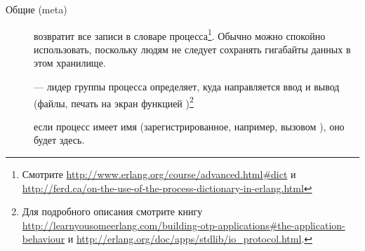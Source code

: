 \documentclass[11pt, oneside]{book}   	%
\begin{document}
\begin{description*}
	\item[Общие (meta)] \hfill
		\begin{description}		
	\item[] возвратит все записи в словаре процесса\footnote{Смотрите \href{http://www.erlang.org/course/advanced.html\#dict}{http://www.erlang.org/course/advanced.html\#dict} и \href{http://ferd.ca/on-the-use-of-the-process-dictionary-in-erlang.html}{http://ferd.ca/on-the-use-of-the-process-dictionary-in-erlang.html}}. Обычно можно спокойно использовать, поскольку людям не следует сохранять гигабайты данных в этом хранилище.
		
	\item[] --- лидер группы процесса определяет, куда направляется ввод и вывод (файлы, печать на экран функцией )\footnote{Для подробного описания смотрите книгу \href{http://learnyousomeerlang.com/building-otp-applications\#the-application-behaviour}{http://learnyousomeerlang.com/building-otp-applications\#the-application-behaviour} и \href{http://erlang.org/doc/apps/stdlib/io\_protocol.html}{http://erlang.org/doc/apps/stdlib/io\_protocol.html}.}
			
	\item[] если процесс имеет имя (зарегистрированное, например, вызовом ), оно будет здесь.
			

\end{description}
\end{description*}
\end{document}
